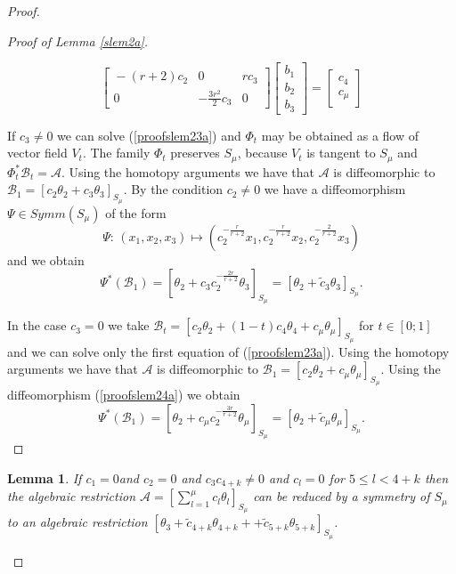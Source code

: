 \documentclass{amsart}
\newtheorem{lem}[thm]{Lemma}
\theoremstyle{definition}
\numberwithin{equation}{section}
\begin{document}
\begin{proof}
\begin{proof}[Proof of Lemma \ref{slem2a}]
\setlength{\arraycolsep}{1mm}
\begin{small}
\begin{equation}  \label{proofslem23a}
\left[ \begin{array}{ccc}
\!-(r\!+\!2)c_2 & 0 & rc_3  \\
0 & -\frac{3r^2}{2}c_3 & 0
\end{array} \right]
\left[ \begin{array}{c} b_1 \\ b_2 \\ b_3   \end{array} \right] =
\left[ \begin{array}{c} c_4  \\  c_{\mu}  \end{array}  \right]
\end{equation}
\end{small}

\noindent  If \;$ c_3\ne 0$ we can solve (\ref{proofslem23a}) and $\Phi_t$ may be obtained as a flow of vector field $V_t$.
The family $\Phi_t$ preserves $S_{\mu}$, because $V_t$ is tangent to $S_{\mu}$ and $\Phi_t^*\mathcal{B}_t=\mathcal{A}$.
Using the homotopy arguments we have that $\mathcal{A}$ is diffeomorphic to $ \mathcal{B}_1=[c_2 \theta_2+c_3 \theta_3]_{S_{\mu}}$.
By the condition $c_2\ne 0$ we have a diffeomorphism $\Psi \in Symm(S_{\mu})$ of the form
  \begin{equation}
\label{proofslem24a}
\Psi:\,(x_1,x_2,x_3)\mapsto (c_2^{-\frac{r}{r+2}} x_1,c_2^{-\frac{r}{r+2}} x_2,c_2^{-\frac{2}{r+2}} x_3)
\end{equation}
and we obtain
\[ \Psi^*(\mathcal{B}_1)=[\theta_2+ c_3 c_2^{-\frac{2r}{r+2}}\theta_3]_{S_{\mu}} =
 [ \theta_2+ \widetilde{c}_3\theta_3]_{S_{\mu}}.\]

 \noindent  In the case \;$ c_3= 0$ we take $\mathcal{B}_t=[c_2 \theta_2+(1-t)c_4 \theta_4+c_{\mu} \theta_{\mu}]_{S_{\mu}}$ \; for $t \in[0;1]$ and we
 can solve only the first equation of (\ref{proofslem23a}).
Using the homotopy arguments we have that $\mathcal{A}$ is diffeomorphic to $ \mathcal{B}_1=[c_2 \theta_2+c_{\mu} \theta_{\mu}]_{S_{\mu}}$.
Using the diffeomorphism (\ref{proofslem24a}) we obtain
\[ \Psi^*(\mathcal{B}_1)=[\theta_2+ c_{\mu} c_2^{-\frac{3r}{r+2}}\theta_{\mu}]_{S_{\mu}} =
 [ \theta_2+ \widetilde{c}_{\mu}\theta_{\mu}]_{S_{\mu}}.\]

 \end{proof}

\begin{lem}
\label{slem3} If \;$c_1= 0$\;and $c_2 = 0$ and $c_3 c_{4+k} \ne 0$ and $c_l=0$ for $5\leq l< 4+k$  then the algebraic restriction $\mathcal{A}=[ \sum_{l=1}^{\mu}c_{l} \theta_{l}]_{S_{\mu}}$ can be reduced by a symmetry of $S_{\mu}$ to an algebraic restriction $[\theta_3+ \widetilde{c}_{4+k}\theta_{4+k}+ +\widetilde{c}_{5+k} \theta_{5+k}]_{S_{\mu}}$.
\end{lem}


\end{proof}
\end{document}
